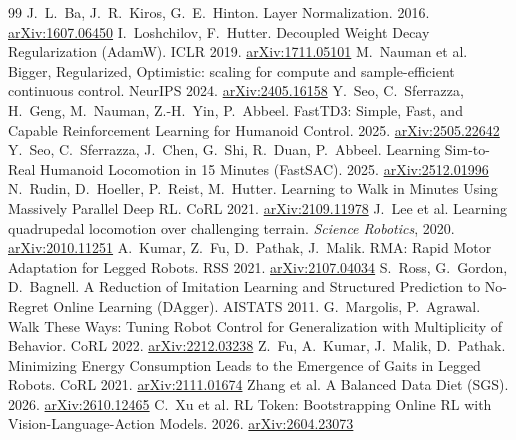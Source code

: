 \documentclass[10pt,letterpaper]{article}
\begin{document}
\begin{thebibliography}{99}
 J.~L.~Ba, J.~R.~Kiros, G.~E.~Hinton. Layer Normalization. 2016. \href{https://arxiv.org/abs/1607.06450}{arXiv:1607.06450}
 I.~Loshchilov, F.~Hutter. Decoupled Weight Decay Regularization (AdamW). ICLR 2019. \href{https://arxiv.org/abs/1711.05101}{arXiv:1711.05101}
 M.~Nauman et al. Bigger, Regularized, Optimistic: scaling for compute and sample-efficient continuous control. NeurIPS 2024. \href{https://arxiv.org/abs/2405.16158}{arXiv:2405.16158}
 Y.~Seo, C.~Sferrazza, H.~Geng, M.~Nauman, Z.-H.~Yin, P.~Abbeel. FastTD3: Simple, Fast, and Capable Reinforcement Learning for Humanoid Control. 2025. \href{https://arxiv.org/abs/2505.22642}{arXiv:2505.22642}
 Y.~Seo, C.~Sferrazza, J.~Chen, G.~Shi, R.~Duan, P.~Abbeel. Learning Sim-to-Real Humanoid Locomotion in 15 Minutes (FastSAC). 2025. \href{https://arxiv.org/abs/2512.01996}{arXiv:2512.01996}
 N.~Rudin, D.~Hoeller, P.~Reist, M.~Hutter. Learning to Walk in Minutes Using Massively Parallel Deep RL. CoRL 2021. \href{https://arxiv.org/abs/2109.11978}{arXiv:2109.11978}
 J.~Lee et al. Learning quadrupedal locomotion over challenging terrain. \emph{Science Robotics}, 2020. \href{https://arxiv.org/abs/2010.11251}{arXiv:2010.11251}
 A.~Kumar, Z.~Fu, D.~Pathak, J.~Malik. RMA: Rapid Motor Adaptation for Legged Robots. RSS 2021. \href{https://arxiv.org/abs/2107.04034}{arXiv:2107.04034}
 S.~Ross, G.~Gordon, D.~Bagnell. A Reduction of Imitation Learning and Structured Prediction to No-Regret Online Learning (DAgger). AISTATS 2011.
 G.~Margolis, P.~Agrawal. Walk These Ways: Tuning Robot Control for Generalization with Multiplicity of Behavior. CoRL 2022. \href{https://arxiv.org/abs/2212.03238}{arXiv:2212.03238}
 Z.~Fu, A.~Kumar, J.~Malik, D.~Pathak. Minimizing Energy Consumption Leads to the Emergence of Gaits in Legged Robots. CoRL 2021. \href{https://arxiv.org/abs/2111.01674}{arXiv:2111.01674}
 Zhang et al. A Balanced Data Diet (SGS). 2026. \href{https://arxiv.org/abs/2610.12465}{arXiv:2610.12465}
 C.~Xu et al. RL Token: Bootstrapping Online RL with Vision-Language-Action Models. 2026. \href{https://arxiv.org/abs/2604.23073}{arXiv:2604.23073}
\end{thebibliography}
\end{document}
